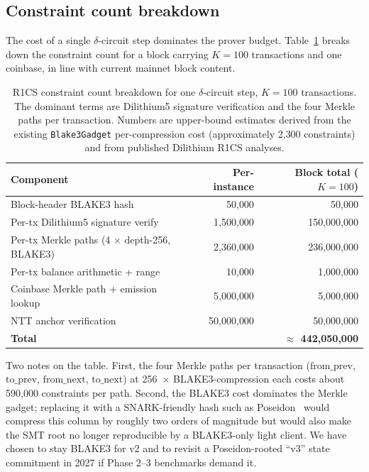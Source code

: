 \documentclass[11pt,a4paper]{article}
\begin{document}
\subsection{Constraint count breakdown}

The cost of a single $\delta$-circuit step dominates the prover budget.
Table~\ref{tab:constraints} breaks down the constraint count for a
block carrying $K = 100$ transactions and one coinbase, in line with
current mainnet block content.

\begin{table}[h]
\centering
\begin{tabular}{lrr}
\toprule
\textbf{Component} & \textbf{Per-instance} & \textbf{Block total ($K=100$)} \\
\midrule
Block-header BLAKE3 hash               & 50{,}000        & 50{,}000 \\
Per-tx Dilithium5 signature verify     & 1{,}500{,}000   & 150{,}000{,}000 \\
Per-tx Merkle paths (4 $\times$ depth-256, BLAKE3) & 2{,}360{,}000 & 236{,}000{,}000 \\
Per-tx balance arithmetic + range      & 10{,}000        & 1{,}000{,}000 \\
Coinbase Merkle path + emission lookup & 5{,}000{,}000   & 5{,}000{,}000 \\
NTT anchor verification                & 50{,}000{,}000  & 50{,}000{,}000 \\
\midrule
\textbf{Total}                         &                 & \textbf{$\approx$ 442{,}050{,}000} \\
\bottomrule
\end{tabular}
\caption{R1CS constraint count breakdown for one $\delta$-circuit step, $K = 100$ transactions.
The dominant terms are Dilithium5 signature verification and the four Merkle paths per
transaction. Numbers are upper-bound estimates derived from the existing
\texttt{Blake3Gadget} per-compression cost (approximately 2{,}300 constraints)
and from published Dilithium R1CS analyses.}
\label{tab:constraints}
\end{table}

Two notes on the table. First, the four Merkle paths per transaction
($\mathrm{from\_prev}$, $\mathrm{to\_prev}$, $\mathrm{from\_next}$,
$\mathrm{to\_next}$) at 256~$\times$ BLAKE3-compression each costs about
590{,}000 constraints per path. Second, the BLAKE3 cost dominates the
Merkle gadget; replacing it with a SNARK-friendly hash such as
Poseidon~\cite{Poseidon} would compress this column by roughly two orders
of magnitude but would also make the SMT root no longer reproducible by a
BLAKE3-only light client. We have chosen to stay BLAKE3 for v2 and to
revisit a Poseidon-rooted ``v3'' state commitment in 2027 if Phase 2--3
benchmarks demand it.
\end{document}
